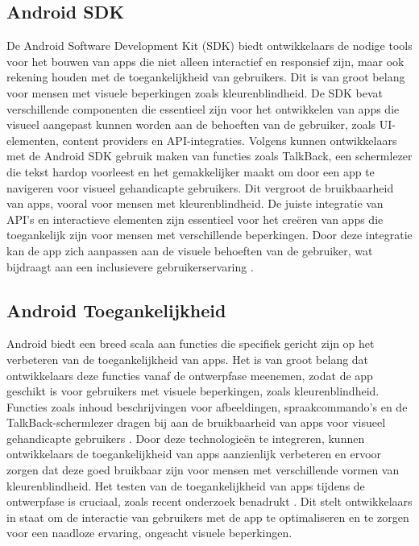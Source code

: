 \subsection{Android SDK}
De Android Software Development Kit (SDK) biedt ontwikkelaars de nodige tools voor het bouwen 
van apps die niet alleen interactief en responsief zijn, maar ook rekening houden met 
de toegankelijkheid van gebruikers. Dit is van groot belang voor mensen met visuele beperkingen 
zoals kleurenblindheid. De SDK bevat verschillende componenten die essentieel zijn voor het 
ontwikkelen van apps die visueel aangepast kunnen worden aan de behoeften van de gebruiker, 
zoals UI-elementen, content providers en API-integraties. Volgens \textcite{Geeks2024} kunnen ontwikkelaars 
met de Android SDK gebruik maken van functies zoals TalkBack, een schermlezer die tekst hardop 
voorleest en het gemakkelijker maakt om door een app te navigeren voor visueel gehandicapte gebruikers. 
Dit vergroot de bruikbaarheid van apps, vooral voor mensen met kleurenblindheid. De juiste integratie 
van API's en interactieve elementen zijn essentieel voor het creëren van apps die toegankelijk zijn 
voor mensen met verschillende beperkingen. Door deze integratie kan de app zich aanpassen aan de 
visuele behoeften van de gebruiker, wat bijdraagt aan een inclusievere gebruikerservaring \autocite{Lee2011}.
\subsection{Android Toegankelijkheid}
Android biedt een breed scala aan functies die specifiek gericht zijn op het verbeteren van 
de toegankelijkheid van apps. Het is van groot belang dat ontwikkelaars deze functies vanaf de 
ontwerpfase meenemen, zodat de app geschikt is voor gebruikers met visuele beperkingen, zoals 
kleurenblindheid. Functies zoals inhoud beschrijvingen voor afbeeldingen, spraakcommando’s en de 
TalkBack-schermlezer dragen bij aan de bruikbaarheid van apps voor visueel gehandicapte 
gebruikers \autocite{Swearngin2024}. Door deze technologieën te integreren, kunnen ontwikkelaars de 
toegankelijkheid van apps aanzienlijk verbeteren en ervoor zorgen dat deze goed bruikbaar zijn voor 
mensen met verschillende vormen van kleurenblindheid. Het testen van de toegankelijkheid van apps 
tijdens de ontwerpfase is cruciaal, zoals recent onderzoek benadrukt \textcite{Gregorio2022}. Dit stelt 
ontwikkelaars in staat om de interactie van gebruikers met de app te optimaliseren en te zorgen voor 
een naadloze ervaring, ongeacht visuele beperkingen.




